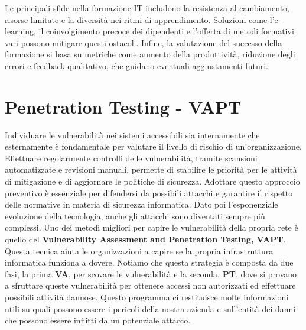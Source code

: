         Le principali sfide nella formazione IT includono la resistenza al cambiamento, risorse limitate e la diversità nei ritmi di apprendimento. Soluzioni come l'e-learning, il coinvolgimento precoce dei dipendenti e l’offerta di metodi formativi vari possono mitigare questi ostacoli. Infine, la valutazione del successo della formazione si basa su metriche come aumento della produttività, riduzione degli errori e feedback qualitativo, che guidano eventuali aggiustamenti futuri.


\section{Penetration Testing - VAPT}
    Individuare le vulnerabilità nei sistemi accessibili sia internamente che esternamente è fondamentale per valutare il livello di rischio di un'organizzazione. Effettuare regolarmente controlli delle vulnerabilità, tramite scansioni automatizzate e revisioni manuali, permette di stabilire le priorità per le attività di mitigazione e di aggiornare le politiche di sicurezza. Adottare questo approccio preventivo è essenziale per difendersi da possibili attacchi e garantire il rispetto delle normative in materia di sicurezza informatica. Dato poi l'esponenziale evoluzione della tecnologia, anche gli attacchi sono diventati sempre più complessi. Uno dei metodi migliori per capire le vulnerabilità della propria rete è quello del \textbf{Vulnerability Assessment and Penetration Testing, VAPT}.\\
    Questa tecnica aiuta le organizzazioni a capire se la propria infrastruttura informatica funziona a dovere. Notiamo che questa strategia è composta da due fasi, la prima \textbf{VA}, per scovare le vulnerabilità e la seconda, \textbf{PT}, dove si provano a sfruttare queste vulnerabilità per ottenere accessi non autorizzati ed effettuare possibili attività dannose. Questo programma ci restituisce molte informazioni utili su quali possono essere i pericoli della nostra azienda e sull'entità dei danni che possono essere inflitti da un potenziale attacco.


